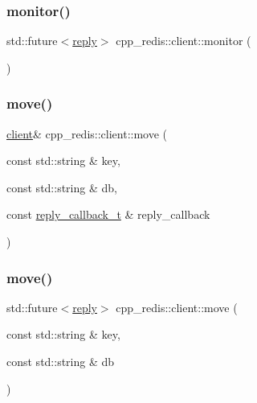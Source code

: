 \mbox{\label{classcpp__redis_1_1client_afd727179e9ee9348ced168a9ac70cbf7}} 
\subsubsection{\texorpdfstring{monitor()}{monitor()}\hspace{0.1cm}{\footnotesize\ttfamily [2/2]}}
{\footnotesize\ttfamily std\+::future$<$\hyperlink{classcpp__redis_1_1reply}{reply}$>$ cpp\+\_\+redis\+::client\+::monitor (\begin{DoxyParamCaption}{ }\end{DoxyParamCaption})}

\mbox{\label{classcpp__redis_1_1client_ad84393d728fb69b527a1d7b009270b58}} 
\subsubsection{\texorpdfstring{move()}{move()}\hspace{0.1cm}{\footnotesize\ttfamily [1/2]}}
{\footnotesize\ttfamily \hyperlink{classcpp__redis_1_1client}{client}\& cpp\+\_\+redis\+::client\+::move (\begin{DoxyParamCaption}\item[{const std\+::string \&}]{key,  }\item[{const std\+::string \&}]{db,  }\item[{const \hyperlink{classcpp__redis_1_1client_a061a1140d36d2eaeda82b09a0bb3f9f2}{reply\+\_\+callback\+\_\+t} \&}]{reply\+\_\+callback }\end{DoxyParamCaption})}

\mbox{\label{classcpp__redis_1_1client_ab50d18d50ac6d0bb7b91347c3a574960}} 
\subsubsection{\texorpdfstring{move()}{move()}\hspace{0.1cm}{\footnotesize\ttfamily [2/2]}}
{\footnotesize\ttfamily std\+::future$<$\hyperlink{classcpp__redis_1_1reply}{reply}$>$ cpp\+\_\+redis\+::client\+::move (\begin{DoxyParamCaption}\item[{const std\+::string \&}]{key,  }\item[{const std\+::string \&}]{db }\end{DoxyParamCaption})}

